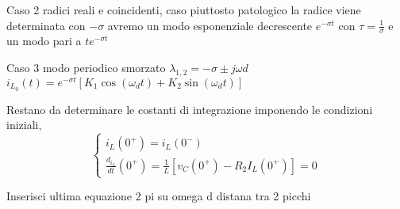 Caso 2 radici reali e coincidenti, caso piuttosto patologico
la radice viene determinata con $-\sigma$ avremo un modo esponenziale decrescente $e^{-\sigma t} $ con $\tau = \frac{1}{\sigma}$
e un modo pari a  $te^{-\sigma t}$


Caso 3 modo periodico smorzato
$\lambda_{1,2} = -\sigma \pm j\omega d$
$i_{L_0}(t) = e^{-\sigma t} [K_1 \cos (\omega_d t) + K_2 \sin(\omega_d t)]$

Restano da determinare le costanti di integrazione imponendo le condizioni iniziali,
\begin{equation*}
\begin{cases}
i_L(0^+) = i_L(0^-) \\
\frac{d_{i_L}}{dt}(0^+) = \frac{1}{L}[v_C(0^+) - R_2I_L(0^+)] = 0
\end{cases}
\end{equation*}

Inserisci ultima equazione
2 pi su omega d distana tra 2 picchi 
